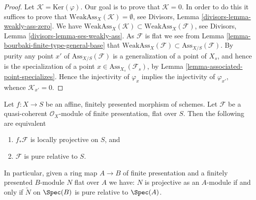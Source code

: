 \begin{proof}
Let $\mathcal{K} = \text{Ker}(\varphi)$. Our goal is to prove that
$\mathcal{K} = 0$. In order to do this it suffices to prove that
$\text{WeakAss}_X(\mathcal{K}) = \emptyset$, see
Divisors, Lemma \ref{divisors-lemma-weakly-ass-zero}.
We have
$\text{WeakAss}_X(\mathcal{K}) \subset \text{WeakAss}_X(\mathcal{F})$, see
Divisors, Lemma \ref{divisors-lemma-ses-weakly-ass}.
As $\mathcal{F}$ is flat we see from
Lemma \ref{lemma-bourbaki-finite-type-general-base}
that $\text{WeakAss}_X(\mathcal{F}) \subset \text{Ass}_{X/S}(\mathcal{F})$.
By purity any point $x'$ of $\text{Ass}_{X/S}(\mathcal{F})$
is a generalization of a point of $X_s$, and hence is the
specialization of a point $x \in \text{Ass}_{X_s}(\mathcal{F}_s)$, by
Lemma \ref{lemma-associated-point-specializes}.
Hence the injectivity of $\varphi_x$ implies the injectivity of
$\varphi_{x'}$, whence $\mathcal{K}_{x'} = 0$.
\end{proof}

\begin{proposition}
\label{proposition-finite-presentation-flat-pure-is-projective}
Let $f : X \to S$ be an affine, finitely presented morphism of schemes.
Let $\mathcal{F}$ be a quasi-coherent $\mathcal{O}_X$-module of
finite presentation, flat over $S$. Then the following
are equivalent
\begin{enumerate}
\item $f_*\mathcal{F}$ is locally projective on $S$, and
\item $\mathcal{F}$ is pure relative to $S$.
\end{enumerate}
In particular, given a ring map $A \to B$ of finite presentation and
a finitely presented $B$-module $N$ flat over $A$ we have:
$N$ is projective as an $A$-module if and only if $\widetilde{N}$
on $\Spec(B)$ is pure relative to $\Spec(A)$.
\end{proposition}

